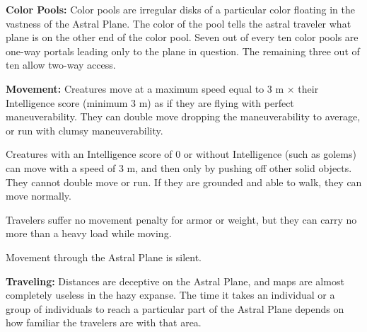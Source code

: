 
\textbf{Color Pools:} Color pools are irregular disks of a particular color floating in the vastness of the Astral Plane. The color of the pool tells the astral traveler what plane is on the other end of the color pool. Seven out of every ten color pools are one-way portals leading only to the plane in question. The remaining three out of ten allow two-way access.

\textbf{Movement:} Creatures move at a maximum speed equal to 3 m $\times$ their Intelligence score (minimum 3 m) as if they are flying with perfect maneuverability. They can double move dropping the maneuverability to average, or run with clumsy maneuverability.

Creatures with an Intelligence score of 0 or without Intelligence (such as golems) can move with a speed of 3 m, and then only by pushing off other solid objects. They cannot double move or run. If they are grounded and able to walk, they can move normally.

Travelers suffer no movement penalty for armor or weight, but they can carry no more than a heavy load while moving.

Movement through the Astral Plane is silent.

\textbf{Traveling:} Distances are deceptive on the Astral Plane, and maps are almost completely useless in the hazy expanse. The time it takes an individual or a group of individuals to reach a particular part of the Astral Plane depends on how familiar the travelers are with that area.

